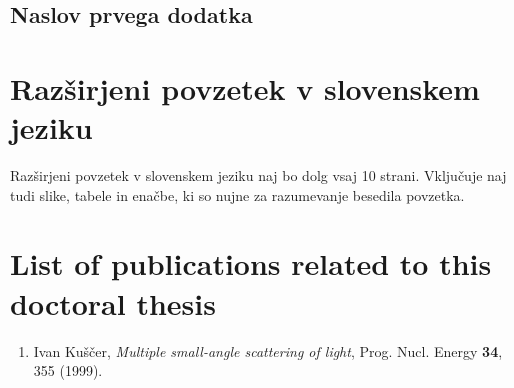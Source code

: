 \cleardoublepage{}
\renewcommand\bibname{Bibliography}





\cleardoublepage{}
\renewcommand\appendixname{Appendix}
\begin{appendices}

\chapter{Naslov prvega dodatka}
    

\end{appendices}


\cleardoublepage{}
{}
\chapter*{Razširjeni povzetek v slovenskem jeziku}

\foreignlanguage{slovene}{  %
Razširjeni povzetek v slovenskem jeziku naj bo dolg vsaj 10 strani. 
Vključuje naj tudi slike, tabele in enačbe, ki so nujne za razumevanje besedila povzetka.
}


\cleardoublepage
\printindex


\cleardoublepage{}
{}
\chapter*{List of publications related to this doctoral thesis}


\begin{enumerate}

\item
Ivan Kuščer,
\textit{Multiple small-angle scattering of light},
Prog. Nucl. Energy
\textbf{34},
355 (1999).

\end{enumerate}


